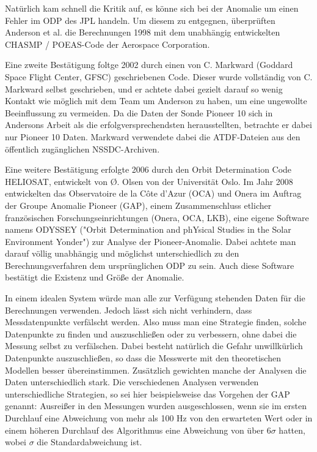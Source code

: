 Natürlich kam schnell die Kritik auf, es könne sich bei der Anomalie um einen Fehler im ODP des JPL handeln.
Um diesem zu entgegnen, überprüften Anderson et al. die Berechnungen 1998 mit dem unabhängig entwickelten CHASMP / POEAS-Code der Aerospace Corporation.

Eine zweite Bestätigung foltge 2002 durch einen von C. Markward (Goddard Space Flight Center, GFSC) geschriebenen
Code. Dieser wurde vollständig von C. Markward selbst geschrieben, und er achtete dabei gezielt darauf so wenig Kontakt wie möglich mit dem Team um Anderson zu haben, um eine ungewollte Beeinflussung zu vermeiden.\cite{Markwardt2002} Da die Daten der Sonde Pioneer 10 sich in Andersons Arbeit als die erfolgversprechendsten herausstellten, betrachte er dabei nur Pioneer 10 Daten.\cite{Markwardt2002}
Markward verwendete dabei die ATDF-Dateien aus den öffentlich zugänglichen NSSDC-Archiven. %

Eine weitere Bestätigung erfolgte 2006 durch den Orbit Determination Code HELIOSAT, entwickelt von Ø. Olsen von der
Universität Oslo.\cite{Olsen2006}
Im Jahr 2008 entwickelten das Observatoire de la Côte d’Azur (OCA) und Onera im Auftrag der Groupe Anomalie Pioneer (GAP), einem Zusammenschluss etlicher französischen Forschungseinrichtungen (Onera, OCA, LKB),
eine eigene Software namens ODYSSEY ("Orbit Determination and phYsical Studies in the Solar Environment Yonder") zur Analyse der Pioneer-Anomalie.
Dabei achtete man darauf völlig unabhängig und möglichst unterschiedlich zu den Berechnungsverfahren dem ursprünglichen ODP zu sein. 
Auch diese Software bestätigt die Existenz und Größe der Anomalie.\cite{Levy2008}


In einem idealen System würde man alle zur Verfügung stehenden Daten für die Berechnungen verwenden. Jedoch lässt sich nicht verhindern, dass Messdatenpunkte verfälscht werden. Also muss man eine Strategie finden, solche Datenpunkte zu finden und auszuschließen oder zu verbessern, ohne dabei die Messung selbst zu verfälschen. Dabei besteht natürlich die Gefahr unwillkürlich Datenpunkte auszuschließen, so dass die Messwerte mit den theoretischen Modellen besser übereinstimmen. Zusätzlich gewichten manche der Analysen die Daten unterschiedlich stark.
Die verschiedenen Analysen verwenden unterschiedliche Strategien, so sei hier beispielsweise das Vorgehen der GAP genannt:
Ausreißer in den Messungen wurden ausgeschlossen, wenn sie im ersten Durchlauf eine Abweichung von mehr als 100 Hz von den erwarteten Wert oder in einem höheren Durchlauf des Algorithmus eine Abweichung von über $6\sigma$ hatten, wobei $\sigma$ die Standardabweichung ist.\cite{Levy2008} %
